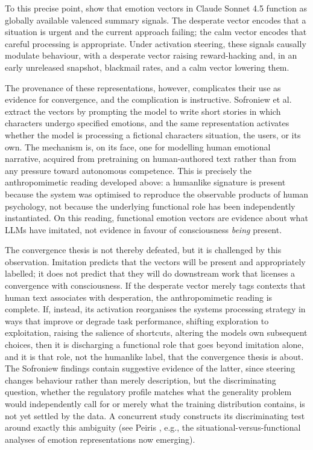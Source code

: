 \documentclass[11pt, a4paper, onecolumn, gdm]{google}
\begin{document}
To this precise point, \citet{sofroniew2026} show that emotion vectors in Claude Sonnet 4.5 function as globally available valenced summary signals.
The \textquotesingle desperate\textquotesingle{} vector encodes that a situation is urgent and the current approach failing; the \textquotesingle calm\textquotesingle{} vector encodes that careful processing is appropriate.
Under activation steering, these signals causally modulate behaviour, with a \textquotesingle desperate\textquotesingle{} vector raising reward-hacking and, in an early unreleased snapshot, blackmail rates, and a \textquotesingle calm\textquotesingle{} vector lowering them.

The provenance of these representations, however, complicates their use as evidence for convergence, and the complication is instructive.
Sofroniew et al. extract the vectors by prompting the model to write short stories in which characters undergo specified emotions, and the same representation activates whether the model is processing a fictional character\textquotesingle s situation, the user\textquotesingle s, or its own.
The mechanism is, on its face, one for modelling human emotional narrative, acquired from pretraining on human-authored text rather than from any pressure toward autonomous competence.
This is precisely the anthropomimetic reading developed above: a humanlike signature is present because the system was optimised to reproduce the observable products of human psychology, not because the underlying functional role has been independently instantiated.
On this reading, functional emotion vectors are evidence about what LLMs have imitated, not evidence in favour of consciousness \emph{being} present.

The convergence thesis is not thereby defeated, but it is challenged by this observation.
Imitation predicts that the vectors will be present and appropriately labelled; it does not predict that they will do downstream work that licenses a convergence with consciousness.
If the \textquotesingle desperate\textquotesingle{} vector merely tags contexts that human text associates with desperation, the anthropomimetic reading is complete.
If, instead, its activation reorganises the system\textquotesingle s processing strategy in ways that improve or degrade task performance, shifting exploration to exploitation, raising the salience of shortcuts, altering the model\textquotesingle s own subsequent choices, then it is discharging a functional role that goes beyond imitation alone, and it is that role, not the humanlike label, that the convergence thesis is about.
The Sofroniew findings contain suggestive evidence of the latter, since steering changes behaviour rather than merely description, but the discriminating question, whether the regulatory profile matches what the generality problem would independently call for or merely what the training distribution contains, is not yet settled by the data.
A concurrent study constructs its discriminating test around exactly this ambiguity (see Peiris \citeyearpar{peiris2026}, e.g., the situational-versus-functional analyses of emotion representations now emerging).
\end{document}
